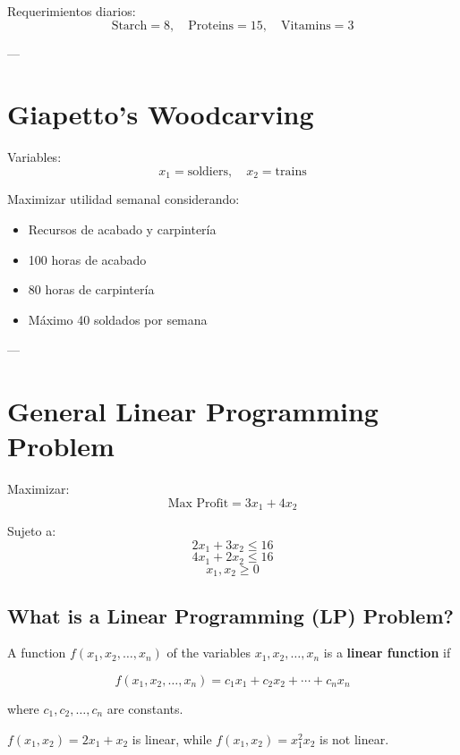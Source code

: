 \documentclass[12pt]{article}
\begin{document}
Requerimientos diarios:
\[
\text{Starch} = 8, \quad \text{Proteins} = 15, \quad \text{Vitamins} = 3
\]

---

\section*{Giapetto's Woodcarving}

Variables:
\[
x_1 = \text{soldiers}, \quad x_2 = \text{trains}
\]

Maximizar utilidad semanal considerando:

\begin{itemize}
\item Recursos de acabado y carpintería
\item 100 horas de acabado
\item 80 horas de carpintería
\item Máximo 40 soldados por semana
\end{itemize}

---

\section*{General Linear Programming Problem}

Maximizar:
\[
\text{Max Profit} = 3x_1 + 4x_2
\]

Sujeto a:
\[
2x_1 + 3x_2 \leq 16
\]
\[
4x_1 + 2x_2 \leq 16
\]
\[
x_1, x_2 \geq 0
\]


\subsection{What is a Linear Programming (LP) Problem?}

\begin{definition}
A function $f(x_1,x_2,\ldots,x_n)$ of the variables 
$x_1,x_2,\ldots,x_n$ is a \textbf{linear function} if

\[
f(x_1,x_2,\ldots,x_n)=c_1x_1+c_2x_2+\cdots+c_nx_n
\]

where $c_1,c_2,\ldots,c_n$ are constants.
\end{definition}

\begin{example}
$f(x_1,x_2)=2x_1+x_2$ is linear, while 
$f(x_1,x_2)=x_1^2x_2$ is not linear.
\end{example}
\end{document}
